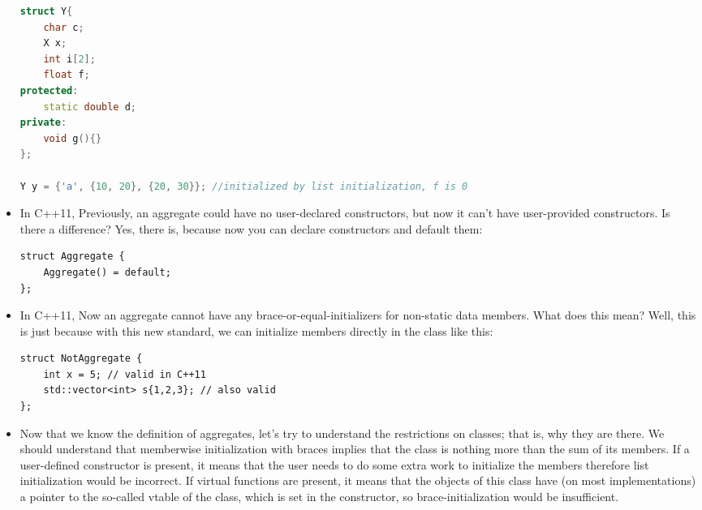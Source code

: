 \documentclass[a4paper,11pt,twoside]{book}
\begin{document}
\begin{itemize}
\begin{lstlisting}[frame=single, language=c++]
struct Y{
	char c;
	X x;
	int i[2];
	float f; 
protected:
	static double d;
private:
	void g(){}      
}; 
	
Y y = {'a', {10, 20}, {20, 30}}; //initialized by list initialization, f is 0
\end{lstlisting}
	
	\item In C++11, Previously, an aggregate could have no user-declared constructors, but now it can't have user-provided constructors. Is there a difference? Yes, there is, because now you can declare constructors and default them:
\begin{lstlisting}[numbers=none]
struct Aggregate {
	Aggregate() = default; 
};
\end{lstlisting}
	
	\item In C++11, Now an aggregate cannot have any brace-or-equal-initializers for non-static data members. What does this mean? Well, this is just because with this new standard, we can initialize members directly in the class like this:
\begin{lstlisting}[numbers=none]
struct NotAggregate {
	int x = 5; // valid in C++11
	std::vector<int> s{1,2,3}; // also valid
};
\end{lstlisting}

	\item Now that we know the definition of aggregates, let's try to understand the restrictions on classes; that is, why they are there. We should understand that memberwise initialization with braces implies that the class is nothing more than the sum of its members. If a user-defined constructor is present, it means that the user needs to do some extra work to initialize the members therefore list initialization would be incorrect. If virtual functions are present, it means that the objects of this class have (on most implementations) a pointer to the so-called vtable of the class, which is set in the constructor, so brace-initialization would be insufficient. 
	
\end{itemize}
\end{document}
